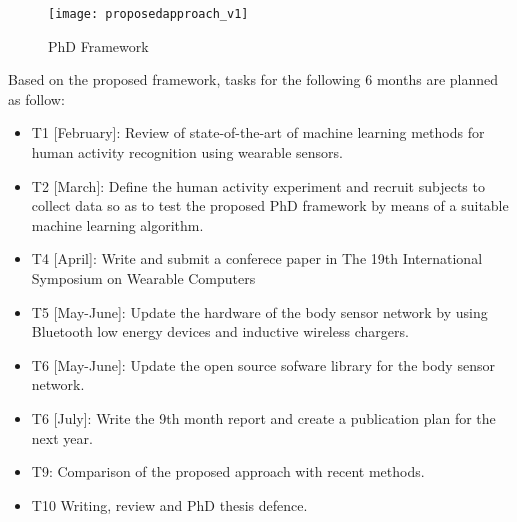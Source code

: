 \begin{figure}[htbp!] 
\centering    
\texttt{[image: proposedapproach\_v1]}
\caption[PA]{PhD Framework}
\label{fig:proposedapproach}
\end{figure}



Based on the proposed framework, 
tasks for the following 6 months are planned as follow:
\begin{itemize}[noitemsep,topsep=0pt,parsep=0pt,partopsep=0pt]
\item T1 [February]: Review of state-of-the-art of machine learning methods 
for human activity recognition using wearable sensors.
\item T2 [March]: Define the human activity experiment and recruit subjects 
to collect data so as to test the proposed PhD framework by means of a suitable
machine learning algorithm.
\item T4 [April]: Write and submit a conferece paper in The 19th International Symposium
on Wearable Computers
\item T5 [May-June]: Update the hardware of the body sensor network by using
Bluetooth low energy devices and inductive wireless chargers. 
\item T6 [May-June]: Update the open source sofware library for the body sensor
network.
\item T6 [July]: Write the 9th month report and create a publication
plan for the next year.


\item T9: Comparison of the proposed approach with recent methods.
\item T10 Writing, review and PhD thesis defence.
\end{itemize}

% 

